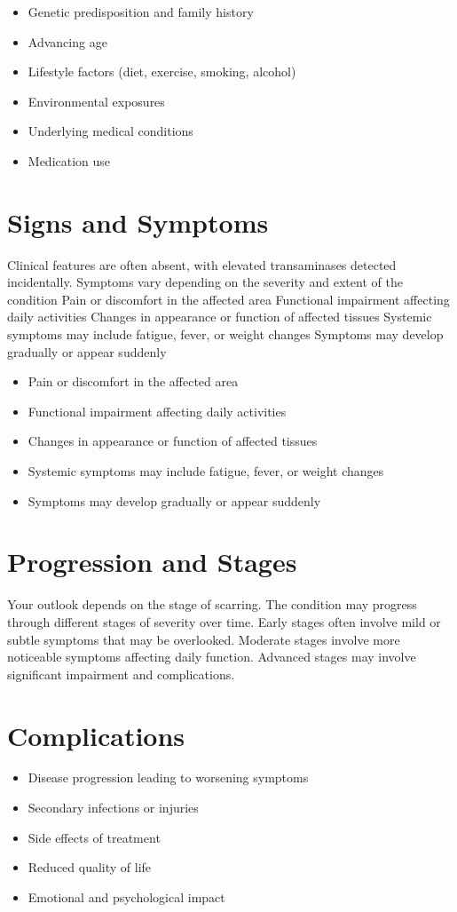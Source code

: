 \begin{itemize}[noitemsep]
  \item Genetic predisposition and family history
  \item Advancing age
  \item Lifestyle factors (diet, exercise, smoking, alcohol)
  \item Environmental exposures
  \item Underlying medical conditions
  \item Medication use
\end{itemize}
\section{Signs and Symptoms}
Clinical features are often absent, with elevated transaminases detected incidentally. Symptoms vary depending on the severity and extent of the condition Pain or discomfort in the affected area Functional impairment affecting daily activities Changes in appearance or function of affected tissues Systemic symptoms may include fatigue, fever, or weight changes Symptoms may develop gradually or appear suddenly

\begin{itemize}[noitemsep]
  \item Pain or discomfort in the affected area
  \item Functional impairment affecting daily activities
  \item Changes in appearance or function of affected tissues
  \item Systemic symptoms may include fatigue, fever, or weight changes
  \item Symptoms may develop gradually or appear suddenly
\end{itemize}
\section{Progression and Stages}
Your outlook depends on the stage of scarring. The condition may progress through different stages of severity over time. Early stages often involve mild or subtle symptoms that may be overlooked. Moderate stages involve more noticeable symptoms affecting daily function. Advanced stages may involve significant impairment and complications.
\section{Complications}
\begin{itemize}[noitemsep]
  \item Disease progression leading to worsening symptoms
  \item Secondary infections or injuries
  \item Side effects of treatment
  \item Reduced quality of life
  \item Emotional and psychological impact
\end{itemize}
